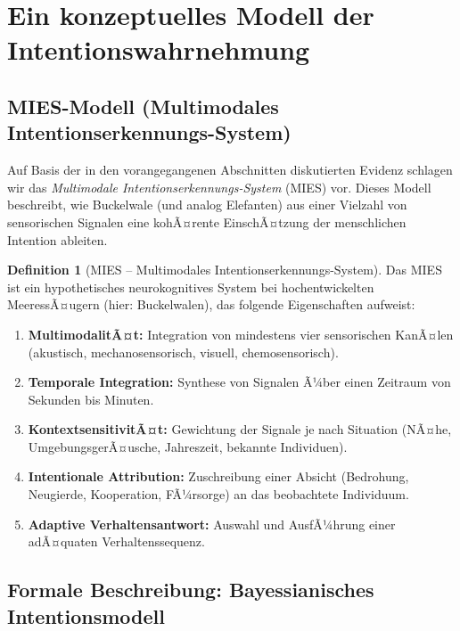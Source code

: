 ﻿\documentclass[12pt,a4paper]{article}
\theoremstyle{definition}
\newtheorem{definition}{Definition}[section]
\theoremstyle{remark}
\begin{document}
\section{Ein konzeptuelles Modell der Intentionswahrnehmung}
\label{sec:modell}

\subsection{MIES-Modell (Multimodales Intentionserkennungs-System)}

Auf Basis der in den vorangegangenen Abschnitten diskutierten Evidenz
schlagen wir das \emph{Multimodale Intentionserkennungs-System} (MIES) vor.
Dieses Modell beschreibt, wie Buckelwale (und analog Elefanten) aus einer
Vielzahl von sensorischen Signalen eine kohÃ¤rente EinschÃ¤tzung der menschlichen
Intention ableiten.

\begin{definition}[MIES -- Multimodales Intentionserkennungs-System]
  Das MIES ist ein hypothetisches neurokognitives System bei hochentwickelten
  MeeressÃ¤ugern (hier: Buckelwalen), das folgende Eigenschaften aufweist:
  \begin{enumerate}[label=(\roman*)]
    \item \textbf{MultimodalitÃ¤t:} Integration von mindestens vier sensorischen
          KanÃ¤len (akustisch, mechanosensorisch, visuell, chemosensorisch).
    \item \textbf{Temporale Integration:} Synthese von Signalen Ã¼ber einen
          Zeitraum von Sekunden bis Minuten.
    \item \textbf{KontextsensitivitÃ¤t:} Gewichtung der Signale je nach
          Situation (NÃ¤he, UmgebungsgerÃ¤usche, Jahreszeit, bekannte Individuen).
    \item \textbf{Intentionale Attribution:} Zuschreibung einer Absicht
          (Bedrohung, Neugierde, Kooperation, FÃ¼rsorge) an das beobachtete Individuum.
    \item \textbf{Adaptive Verhaltensantwort:} Auswahl und AusfÃ¼hrung einer
          adÃ¤quaten Verhaltenssequenz.
  \end{enumerate}
\end{definition}

\subsection{Formale Beschreibung: Bayessianisches Intentionsmodell}
\end{document}
